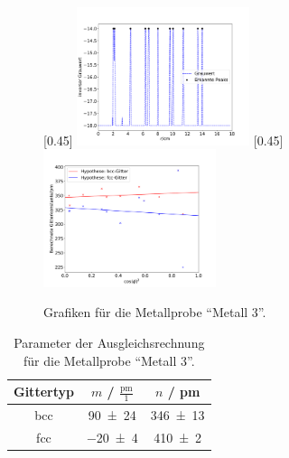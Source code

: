 \begin{figure}[h!]
  \centering
  [0.45\textwidth]{
  \centering
  \includegraphics[width=0.45\textwidth]{Auswertung/Grafiken/Metall_Peaks.pdf}
  }
  [0.45\textwidth]{
  \centering
  \includegraphics[width=0.45\textwidth]{Auswertung/Grafiken/Metall_Ausgleichsrechnung.pdf}
  }\\
  \label{Abb:Metall_Plots}
  \caption{Grafiken für die Metallprobe \enquote{Metall 3}.}
\end{figure}

\begin{table}[H]
  \centering
  \caption{Parameter der Ausgleichsrechnung für die Metallprobe \enquote{Metall 3}.}
  \label{Tab:Metall_Regression}
  \begin{tabular}{c | c c }
    \toprule
    Gittertyp &
    $m$ / $\frac{\mathrm{pm}}{1}$ &
    $n$ / pm \\
    \midrule
    bcc & \num{90(24)} & \num{346(13)} \\
    fcc & \num{-20(4)} & \num{410(2)} \\
    \bottomrule
  \end{tabular}
\end{table}

